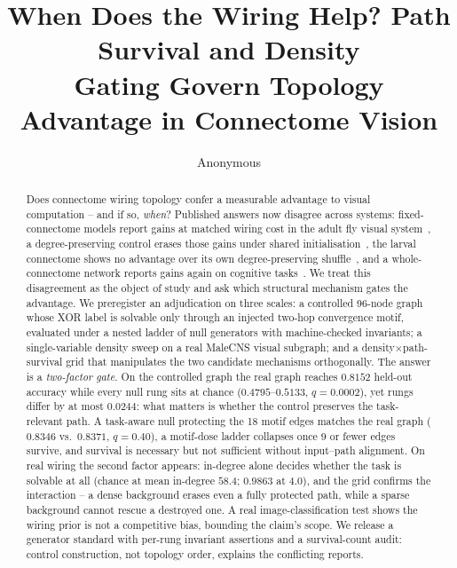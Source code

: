 \documentclass[10pt,twocolumn,letterpaper]{article}
\title{When Does the Wiring Help? Path Survival and Density\\ Gating Govern Topology Advantage in Connectome Vision}
\author{Anonymous}
\begin{document}
\maketitle

\begin{abstract}
Does connectome wiring topology confer a measurable advantage to visual
computation -- and if so, \emph{when}? Published answers now disagree across
systems: fixed-connectome models report gains at matched wiring cost in the
adult fly visual system~\cite{structurealone2026}, a degree-preserving control
erases those gains under shared initialisation~\cite{toposens2026}, the larval
connectome shows no advantage over its own degree-preserving
shuffle~\cite{larvanull2026}, and a whole-connectome network reports gains
again on cognitive tasks~\cite{cho2026whole}. We treat this disagreement as
the object of study and ask which structural mechanism gates the advantage.
We preregister an adjudication on three scales: a controlled 96-node graph
whose XOR label is solvable only through an injected two-hop convergence
motif, evaluated under a nested ladder of null generators with machine-checked
invariants; a single-variable density sweep on a real MaleCNS visual
subgraph; and a density$\times$path-survival grid that manipulates the two
candidate mechanisms orthogonally. The answer is a \emph{two-factor gate}. On
the controlled graph the real graph reaches $0.8152$ held-out accuracy while
every null rung sits at chance ($0.4795$--$0.5133$, $q=0.0002$), yet rungs
differ by at most $0.0244$: what matters is whether the control preserves the
task-relevant path. A task-aware null protecting the 18 motif edges matches
the real graph ($0.8346$ vs.\ $0.8371$, $q=0.40$), a motif-dose ladder
collapses once 9 or fewer edges survive, and survival is necessary but not
sufficient without input--path alignment. On real wiring the second factor appears:
in-degree alone decides whether the task is solvable at all (chance at mean
in-degree $58.4$; $0.9863$ at $4.0$), and the grid confirms the interaction --
a dense background erases even a fully protected path, while a sparse
background cannot rescue a destroyed one. A real image-classification test
shows the wiring prior is not a competitive bias, bounding the claim's scope.
We release a generator standard with per-rung invariant assertions and a
survival-count audit: control construction, not topology order, explains the
conflicting reports.
\end{abstract}







\end{document}
